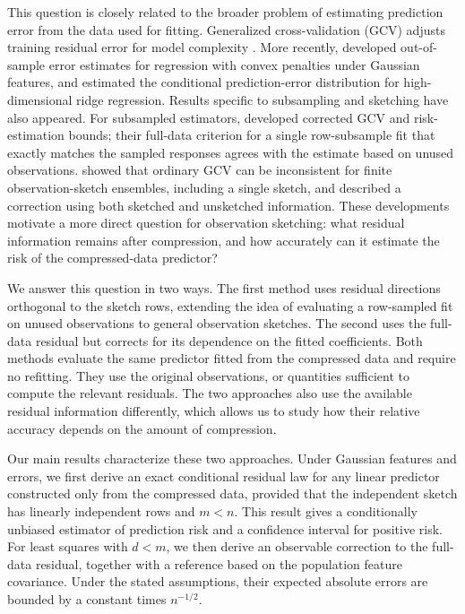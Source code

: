 \documentclass{article}
\theoremstyle{plain}
\theoremstyle{definition}
\theoremstyle{definition}
\begin{document}
This question is closely related to the broader problem of estimating prediction error from the data used for fitting. Generalized cross-validation (GCV) adjusts training residual error for model complexity \citep{golub1979generalized}. More recently, \citet{bellec2023out} developed out-of-sample error estimates for regression with convex penalties under Gaussian features, and \citet{patil2022estimating} estimated the conditional prediction-error distribution for high-dimensional ridge regression. Results specific to subsampling and sketching have also appeared. For subsampled estimators, \citet{bellec2025corrected} developed corrected GCV and risk-estimation bounds; their full-data criterion for a single row-subsample fit that exactly matches the sampled responses agrees with the estimate based on unused observations. \citet{patil2024asymptotically} showed that ordinary GCV can be inconsistent for finite observation-sketch ensembles, including a single sketch, and described a correction using both sketched and unsketched information. These developments motivate a more direct question for observation sketching: what residual information remains after compression, and how accurately can it estimate the risk of the compressed-data predictor?

We answer this question in two ways. The first method uses residual directions orthogonal to the sketch rows, extending the idea of evaluating a row-sampled fit on unused observations to general observation sketches. The second uses the full-data residual but corrects for its dependence on the fitted coefficients. Both methods evaluate the same predictor fitted from the compressed data and require no refitting. They use the original observations, or quantities sufficient to compute the relevant residuals. The two approaches also use the available residual information differently, which allows us to study how their relative accuracy depends on the amount of compression.


Our main results characterize these two approaches. Under Gaussian features and errors, we first derive an exact conditional residual law for any linear predictor constructed only from the compressed data, provided that the independent sketch has linearly independent rows and $m<n$. This result gives a conditionally unbiased estimator of prediction risk and a confidence interval for positive risk. For least squares with $d<m$, we then derive an observable correction to the full-data residual, together with a reference based on the population feature covariance. Under the stated assumptions, their expected absolute errors are bounded by a constant times $n^{-1/2}$.
\end{document}
